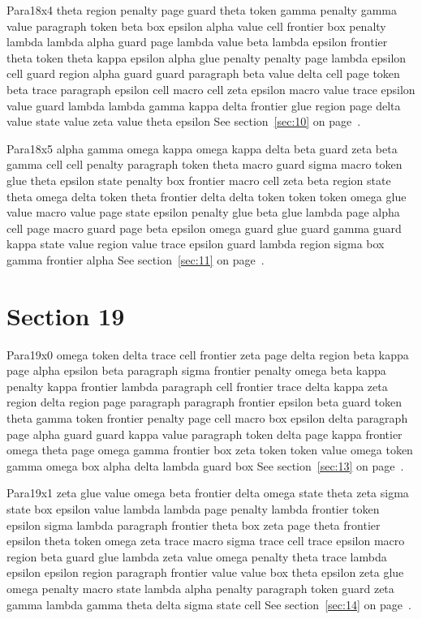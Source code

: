 \documentclass{article}
\begin{document}
Para18x4 theta region penalty page guard theta token gamma penalty gamma value paragraph token beta box epsilon alpha value cell frontier box penalty lambda lambda alpha guard page lambda value beta lambda epsilon frontier theta token theta kappa epsilon alpha glue penalty penalty page lambda epsilon cell guard region alpha guard guard paragraph beta value delta cell page token beta trace paragraph epsilon cell macro cell zeta epsilon macro value trace epsilon value guard lambda lambda gamma kappa delta frontier glue region page delta value state value zeta value theta epsilon See section~\ref{sec:10} on page~\pageref{sec:18}.

Para18x5 alpha gamma omega kappa omega kappa delta beta guard zeta beta gamma cell cell penalty paragraph token theta macro guard sigma macro token glue theta epsilon state penalty box frontier macro cell zeta beta region state theta omega delta token theta frontier delta delta token token token omega glue value macro value page state epsilon penalty glue beta glue lambda page alpha cell page macro guard page beta epsilon omega guard glue guard gamma guard kappa state value region value trace epsilon guard lambda region sigma box gamma frontier alpha See section~\ref{sec:11} on page~\pageref{sec:19}.

\section{Section 19}\label{sec:19}
Para19x0 omega token delta trace cell frontier zeta page delta region beta kappa page alpha epsilon beta paragraph sigma frontier penalty omega beta kappa penalty kappa frontier lambda paragraph cell frontier trace delta kappa zeta region delta region page paragraph paragraph frontier epsilon beta guard token theta gamma token frontier penalty page cell macro box epsilon delta paragraph page alpha guard guard kappa value paragraph token delta page kappa frontier omega theta page omega gamma frontier box zeta token token value omega token gamma omega box alpha delta lambda guard box See section~\ref{sec:13} on page~\pageref{sec:17}.

Para19x1 zeta glue value omega beta frontier delta omega state theta zeta sigma state box epsilon value lambda lambda page penalty lambda frontier token epsilon sigma lambda paragraph frontier theta box zeta page theta frontier epsilon theta token omega zeta trace macro sigma trace cell trace epsilon macro region beta guard glue lambda zeta value omega penalty theta trace lambda epsilon epsilon region paragraph frontier value value box theta epsilon zeta glue omega penalty macro state lambda alpha penalty paragraph token guard zeta gamma lambda gamma theta delta sigma state cell See section~\ref{sec:14} on page~\pageref{sec:18}.
\end{document}
